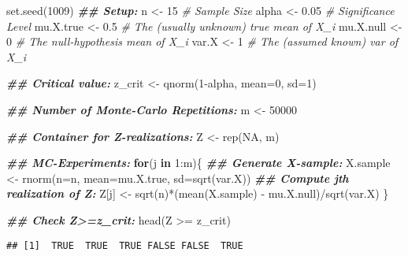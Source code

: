 \documentclass[
]{book}
\newenvironment{Shaded}{\begin{snugshade}}{\end{snugshade}}
\newcommand{\AttributeTok}[1]{\textcolor[rgb]{0.77,0.63,0.00}{#1}}
\newcommand{\CommentTok}[1]{\textcolor[rgb]{0.56,0.35,0.01}{\textit{#1}}}
\newcommand{\ConstantTok}[1]{\textcolor[rgb]{0.00,0.00,0.00}{#1}}
\newcommand{\ControlFlowTok}[1]{\textcolor[rgb]{0.13,0.29,0.53}{\textbf{#1}}}
\newcommand{\DecValTok}[1]{\textcolor[rgb]{0.00,0.00,0.81}{#1}}
\newcommand{\DocumentationTok}[1]{\textcolor[rgb]{0.56,0.35,0.01}{\textbf{\textit{#1}}}}
\newcommand{\FloatTok}[1]{\textcolor[rgb]{0.00,0.00,0.81}{#1}}
\newcommand{\FunctionTok}[1]{\textcolor[rgb]{0.00,0.00,0.00}{#1}}
\newcommand{\NormalTok}[1]{#1}
\newcommand{\OtherTok}[1]{\textcolor[rgb]{0.56,0.35,0.01}{#1}}
\newcommand{\SpecialCharTok}[1]{\textcolor[rgb]{0.00,0.00,0.00}{#1}}
\begin{document}
\begin{Shaded}
\begin{Highlighting}[]
\FunctionTok{set.seed}\NormalTok{(}\DecValTok{1009}\NormalTok{)}
\DocumentationTok{\#\# Setup:}
\NormalTok{n         }\OtherTok{\textless{}{-}} \DecValTok{15}    \CommentTok{\# Sample Size}
\NormalTok{alpha     }\OtherTok{\textless{}{-}}  \FloatTok{0.05} \CommentTok{\# Significance Level}
\NormalTok{mu.X.true }\OtherTok{\textless{}{-}}  \FloatTok{0.5}  \CommentTok{\# The (usually unknown) true mean of X\_i}
\NormalTok{mu.X.null }\OtherTok{\textless{}{-}}  \DecValTok{0}    \CommentTok{\# The null{-}hypothesis mean of X\_i}
\NormalTok{var.X     }\OtherTok{\textless{}{-}}  \DecValTok{1}    \CommentTok{\# The (assumed known)  var of X\_i}

\DocumentationTok{\#\# Critical value:}
\NormalTok{z\_crit }\OtherTok{\textless{}{-}} \FunctionTok{qnorm}\NormalTok{(}\DecValTok{1}\SpecialCharTok{{-}}\NormalTok{alpha, }\AttributeTok{mean=}\DecValTok{0}\NormalTok{, }\AttributeTok{sd=}\DecValTok{1}\NormalTok{)}

\DocumentationTok{\#\# Number of Monte{-}Carlo Repetitions:}
\NormalTok{m         }\OtherTok{\textless{}{-}} \DecValTok{50000}

\DocumentationTok{\#\# Container for Z{-}realizations:}
\NormalTok{Z         }\OtherTok{\textless{}{-}} \FunctionTok{rep}\NormalTok{(}\ConstantTok{NA}\NormalTok{, m)}

\DocumentationTok{\#\# MC{-}Experiments:}
\ControlFlowTok{for}\NormalTok{(j }\ControlFlowTok{in} \DecValTok{1}\SpecialCharTok{:}\NormalTok{m)\{}
  \DocumentationTok{\#\# Generate X{-}sample:}
\NormalTok{  X.sample }\OtherTok{\textless{}{-}} \FunctionTok{rnorm}\NormalTok{(}\AttributeTok{n=}\NormalTok{n, }\AttributeTok{mean=}\NormalTok{mu.X.true, }\AttributeTok{sd=}\FunctionTok{sqrt}\NormalTok{(var.X))}
  \DocumentationTok{\#\# Compute jth realization of Z:}
\NormalTok{  Z[j]     }\OtherTok{\textless{}{-}} \FunctionTok{sqrt}\NormalTok{(n)}\SpecialCharTok{*}\NormalTok{(}\FunctionTok{mean}\NormalTok{(X.sample) }\SpecialCharTok{{-}}\NormalTok{ mu.X.null)}\SpecialCharTok{/}\FunctionTok{sqrt}\NormalTok{(var.X)}
\NormalTok{\}}

\DocumentationTok{\#\# Check Z\textgreater{}=z\_crit:}
\FunctionTok{head}\NormalTok{(Z }\SpecialCharTok{\textgreater{}=}\NormalTok{ z\_crit)}
\end{Highlighting}
\end{Shaded}

\begin{verbatim}
## [1]  TRUE  TRUE  TRUE FALSE FALSE  TRUE
\end{verbatim}
\end{document}
